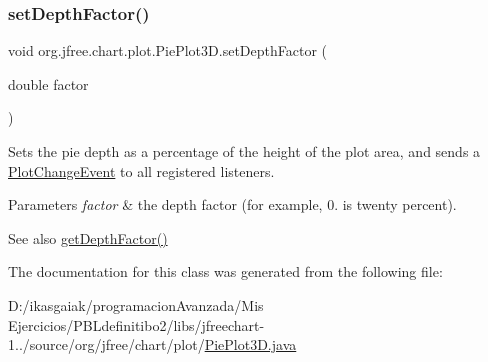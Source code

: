 \subsubsection{\texorpdfstring{set\+Depth\+Factor()}{setDepthFactor()}}
{\footnotesize\ttfamily void org.\+jfree.\+chart.\+plot.\+Pie\+Plot3\+D.\+set\+Depth\+Factor (\begin{DoxyParamCaption}\item[{double}]{factor }\end{DoxyParamCaption})}

Sets the pie depth as a percentage of the height of the plot area, and sends a \mbox{\hyperlink{}{Plot\+Change\+Event}} to all registered listeners.


\begin{DoxyParams}{Parameters}
{\em factor} & the depth factor (for example, 0. is twenty percent).\\
\hline
\end{DoxyParams}
\begin{DoxySeeAlso}{See also}
\mbox{\hyperlink{classorg_1_1jfree_1_1chart_1_1plot_1_1_pie_plot3_d_a10ffdfa0adfbe06f4344390b3e9596c5}{get\+Depth\+Factor()}} 
\end{DoxySeeAlso}


The documentation for this class was generated from the following file\+:\begin{DoxyCompactItemize}
\item 
D\+:/ikasgaiak/programacion\+Avanzada/\+Mis Ejercicios/\+P\+B\+Ldefinitibo2/libs/jfreechart-\/1../source/org/jfree/chart/plot/\mbox{\hyperlink{_pie_plot3_d_8java}{Pie\+Plot3\+D.\+java}}\end{DoxyCompactItemize}
